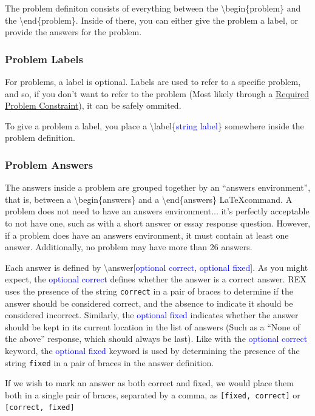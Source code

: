 \documentclass{article}
\begin{document}
The problem definiton consists of everything between the \textbackslash{begin}\{problem\} and the \textbackslash{end}\{problem\}. Inside of there, you can either give the problem a label, or provide the answers for the problem.

\subsubsection{Problem Labels}
For problems, a label is optional. Labels are used to refer to a specific problem, and so, if you don't want to refer to the problem (Most likely through a \hyperref[RequiredProblemConstraints]{Required Problem Constraint}), it can be safely ommited.

To give a problem a label, you place a \textbackslash{label}\{\textcolor{blue}{string label}\} somewhere inside the problem definition.

\subsubsection{Problem Answers}
The answers inside a problem are grouped together by an ``answers environment'', that is, between a \textbackslash{begin}\{answers\} and a \textbackslash{end}\{answers\} \LaTeX command. A problem does not need to have an answers environment... it's perfectly acceptable to not have one, such as with a short answer or essay response question. However, if a problem does have an answers environment, it must contain at least one answer. Additionally, no problem may have more than 26 answers.

Each answer is defined by \textbackslash{answer}[\textcolor{blue}{optional correct}, \textcolor{blue}{optional fixed}]. As you might expect, the \textcolor{blue}{optional correct} defines whether the answer is a correct answer. REX uses the presence of the string \texttt{correct} in a pair of braces to determine if the answer should be considered correct, and the absence to indicate it should be considered incorrect. Similarly, the \textcolor{blue}{optional fixed} indicates whether the answer should be kept in its current location in the list of answers (Such as a ``None of the above'' response, which should always be last). Like with the \textcolor{blue}{optional correct} keyword, the \textcolor{blue}{optional fixed} keyword is used by determining the presence of the string \texttt{fixed} in a pair of braces in the answer definition.

If we wish to mark an answer as both correct and fixed, we would place them both in a single pair of braces, separated by a comma, as \texttt{[fixed, correct]} or \texttt{[correct, fixed]}
\end{document}
